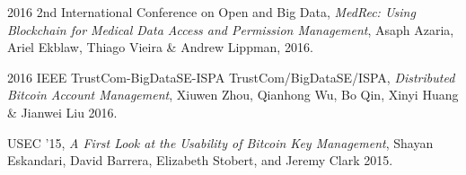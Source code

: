 \begin{thebibliography}{1}
  2016 2nd International Conference on Open and Big Data,
  \emph{MedRec: Using Blockchain for Medical Data Access and Permission
Management},
  Asaph Azaria, Ariel Ekblaw, Thiago Vieira \& Andrew Lippman,
  2016.

  2016 IEEE TrustCom-BigDataSE-ISPA TrustCom/BigDataSE/ISPA,
  \emph{Distributed Bitcoin Account Management},
  Xiuwen Zhou, Qianhong Wu, Bo Qin, Xinyi Huang \& Jianwei Liu
  2016.


  USEC ’15,
  \emph{A First Look at the Usability of Bitcoin Key Management},
  Shayan Eskandari, David Barrera, Elizabeth Stobert, and Jeremy Clark
  2015.


\end{thebibliography}
